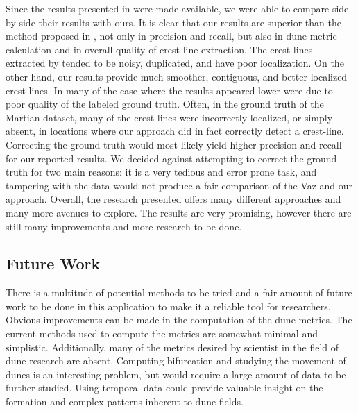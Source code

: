 Since the results presented in \cite{vaz_object_based_dune_analysis} were made available, we were able to compare side-by-side their results with ours. It is clear that our results are superior than the method proposed in \cite{vaz_object_based_dune_analysis}, not only in precision and recall, but also in dune metric calculation and in overall quality of crest-line extraction. The crest-lines extracted by \cite{vaz_object_based_dune_analysis} tended to be noisy, duplicated, and have poor localization. On the other hand, our results provide much smoother, contiguous, and better localized crest-lines. In many of the case where the results appeared lower were due to poor quality of the labeled ground truth. Often, in the ground truth of the Martian dataset, many of the crest-lines were incorrectly localized, or simply absent, in locations where our approach did in fact correctly detect a crest-line. Correcting the ground truth would most likely yield higher precision and recall for our reported results. We decided against attempting to correct the ground truth for two main reasons: it is a very tedious and error prone task, and tampering with the data would not produce a fair comparison of the Vaz \cite{vaz_object_based_dune_analysis} and our approach. Overall, the research presented offers many different approaches and many more avenues to explore. The results are very promising, however there are still many improvements and more research to be done. 

\subsection{Future Work}

There is a multitude of potential methods to be tried and a fair amount of future work to be done in this application to make it a reliable tool for researchers. Obvious improvements can be made in the computation of the dune metrics. The current methods used to compute the metrics are somewhat minimal and simplistic. Additionally, many of the metrics desired by scientist in the field of dune research are absent. Computing bifurcation and studying the movement of dunes is an interesting problem, but would require a large amount of data to be further studied. Using temporal data could provide valuable insight on the formation and complex patterns inherent to dune fields.

